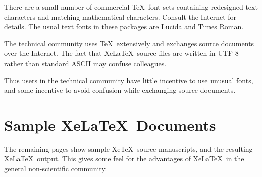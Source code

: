 \documentclass[11pt, oneside]{amsart}
\begin{document}
\begin{multicols}{2}
There are a small number of commercial \TeX\ font sets containing redesigned text characters and matching mathematical characters. Consult the Internet for details. The usual text fonts in these packages are Lucida and Times Roman.

The technical community uses \TeX\ extensively and exchanges source documents over the Internet. The fact that Xe\LaTeX\ source files are written in UTF-8 rather than standard ASCII may confuse colleagues. 

Thus users in the technical community have little incentive to use unusual fonts, and some incentive to avoid confusion while exchanging source documents.

\section{Sample Xe\LaTeX\ Documents}

The remaining pages show sample Xe\TeX\ source manuscripts, and the resulting Xe\LaTeX\ output. This gives some feel for the advantages of Xe\LaTeX\ in the general non-scientific community. 
\end{multicols}








\end{document}
